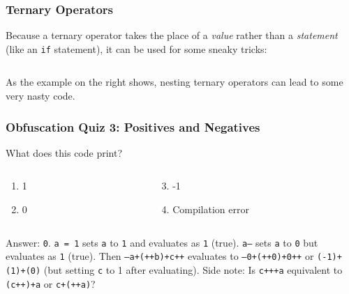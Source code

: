 \documentclass[handout,xcolor]{beamer}
\begin{document}
\begin{frame}
	\frametitle{Ternary Operators}
	\pause
	
	Because a ternary operator takes the place of a \textit{value} rather than a \textit{statement} (like an \texttt{if} statement), it can be used for some sneaky tricks:
	\pause
	
	\begin{columns}
		\begin{column}{0.45\textwidth}
			\centering
			
		\end{column}
		\pause
		\begin{column}{0.45\textwidth}
			\centering
			
		\end{column}
	\end{columns}
	
	As the example on the right shows, nesting ternary operators can lead to some very nasty code.
\end{frame}

\begin{frame}
	\frametitle{Obfuscation Quiz 3: Positives and Negatives}
	\pause
	
	What does this code print?
	
	
	\pause
	
	\begin{columns}
		\begin{column}{0.45\textwidth}
			\begin{enumerate}
				\item 1
				\pause
				\item 0
			\end{enumerate}
		\end{column}
		\pause
		\begin{column}{0.45\textwidth}
			\begin{enumerate}
				\setcounter{enumi}{2}
				\item -1
				\pause
				\item Compilation error
			\end{enumerate}
		\end{column}
	\end{columns}
	\pause
	
	\vspace{0.5cm}
	
	Answer: \texttt{0}. \pause \texttt{a = 1} sets \texttt{a} to \texttt{1} and evaluates as \texttt{1} (true). \pause \texttt{a--} sets \texttt{a} to \texttt{0} but evaluates as \texttt{1} (true). \pause Then \texttt{--a+(++b)+c++} evaluates to \texttt{--0+(++0)+0++} or \texttt{(-1)+(1)+(0)} (but setting \texttt{c} to 1 after evaluating). \pause Side note: Is \texttt{c+++a} equivalent to \texttt{(c++)+a} or \texttt{c+(++a)}?
\end{frame}
\end{document}
